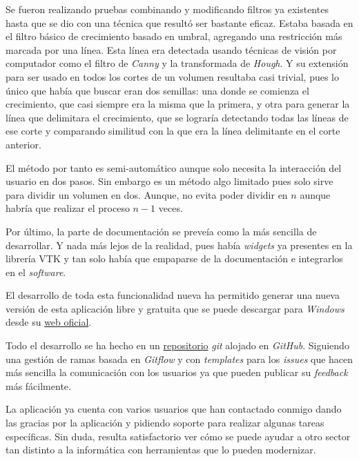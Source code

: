 Se fueron realizando pruebas combinando y modificando filtros ya existentes hasta que se dio con una técnica que resultó ser bastante eficaz. Estaba basada en el filtro básico de crecimiento basado en umbral, agregando una restricción más marcada por una línea. Esta línea era detectada usando técnicas de visión por computador como el filtro de \textit{Canny} y la transformada de \textit{Hough}. Y su extensión para ser usado en todos los cortes de un volumen resultaba casi trivial, pues lo único que había que buscar eran dos semillas: una donde se comienza el crecimiento, que casi siempre era la misma que la primera, y otra para generar la línea que delimitara el crecimiento, que se lograría detectando todas las líneas de ese corte y comparando similitud con la que era la línea delimitante en el corte anterior.

El método por tanto es semi-automático aunque solo necesita la interacción del usuario en dos pasos. Sin embargo es un método algo limitado pues solo sirve para dividir un volumen en dos. Aunque, no evita poder dividir en $n$ aunque habría que realizar el proceso $n-1$ veces.

Por último, la parte de documentación se preveía como la más sencilla de desarrollar. Y nada más lejos de la realidad, pues había \textit{widgets} ya presentes en la librería VTK y tan solo había que empaparse de la documentación e integrarlos en el \textit{software}.

El desarrollo de toda esta funcionalidad nueva ha permitido generar una nueva versión de esta aplicación libre y gratuita que se puede descargar para \textit{Windows} desde su \href{https://fblupi.github.io/3DCurator/es/}{web oficial}.

Todo el desarrollo se ha hecho en un \href{https://github.com/fblupi/3DCurator}{repositorio} \textit{git} alojado en \textit{GitHub}. Siguiendo una gestión de ramas basada en \textit{Gitflow} y con \textit{templates} para los \textit{issues} que hacen más sencilla la comunicación con los usuarios ya que pueden publicar su \textit{feedback} más fácilmente.

La aplicación ya cuenta con varios usuarios que han contactado conmigo dando las gracias por la aplicación y pidiendo soporte para realizar algunas tareas específicas. Sin duda, resulta satisfactorio ver cómo se puede ayudar a otro sector tan distinto a la informática con herramientas que lo pueden modernizar.
